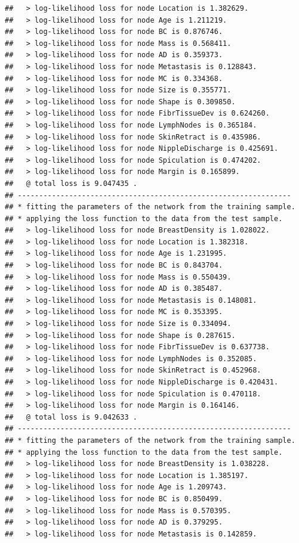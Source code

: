 \documentclass[]{article}
\begin{document}
\begin{verbatim}
##   > log-likelihood loss for node Location is 1.382629.
##   > log-likelihood loss for node Age is 1.211219.
##   > log-likelihood loss for node BC is 0.876746.
##   > log-likelihood loss for node Mass is 0.568411.
##   > log-likelihood loss for node AD is 0.359373.
##   > log-likelihood loss for node Metastasis is 0.128843.
##   > log-likelihood loss for node MC is 0.334368.
##   > log-likelihood loss for node Size is 0.355771.
##   > log-likelihood loss for node Shape is 0.309850.
##   > log-likelihood loss for node FibrTissueDev is 0.624260.
##   > log-likelihood loss for node LymphNodes is 0.365184.
##   > log-likelihood loss for node SkinRetract is 0.435986.
##   > log-likelihood loss for node NippleDischarge is 0.425691.
##   > log-likelihood loss for node Spiculation is 0.474202.
##   > log-likelihood loss for node Margin is 0.165899.
##   @ total loss is 9.047435 .
## ----------------------------------------------------------------
## * fitting the parameters of the network from the training sample.
## * applying the loss function to the data from the test sample.
##   > log-likelihood loss for node BreastDensity is 1.028022.
##   > log-likelihood loss for node Location is 1.382318.
##   > log-likelihood loss for node Age is 1.231995.
##   > log-likelihood loss for node BC is 0.843704.
##   > log-likelihood loss for node Mass is 0.550439.
##   > log-likelihood loss for node AD is 0.385487.
##   > log-likelihood loss for node Metastasis is 0.148081.
##   > log-likelihood loss for node MC is 0.353395.
##   > log-likelihood loss for node Size is 0.334094.
##   > log-likelihood loss for node Shape is 0.287615.
##   > log-likelihood loss for node FibrTissueDev is 0.637738.
##   > log-likelihood loss for node LymphNodes is 0.352085.
##   > log-likelihood loss for node SkinRetract is 0.452968.
##   > log-likelihood loss for node NippleDischarge is 0.420431.
##   > log-likelihood loss for node Spiculation is 0.470118.
##   > log-likelihood loss for node Margin is 0.164146.
##   @ total loss is 9.042633 .
## ----------------------------------------------------------------
## * fitting the parameters of the network from the training sample.
## * applying the loss function to the data from the test sample.
##   > log-likelihood loss for node BreastDensity is 1.038228.
##   > log-likelihood loss for node Location is 1.385197.
##   > log-likelihood loss for node Age is 1.209743.
##   > log-likelihood loss for node BC is 0.850499.
##   > log-likelihood loss for node Mass is 0.570395.
##   > log-likelihood loss for node AD is 0.379295.
##   > log-likelihood loss for node Metastasis is 0.142859.

\end{verbatim}
\end{document}
